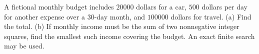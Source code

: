 A fictional monthly budget includes $20000$ dollars for a car, $500$ dollars per day for another expense over a $30$-day month, and $100000$ dollars for travel. (a) Find the total. (b) If monthly income must be the sum of two nonnegative integer squares, find the smallest such income covering the budget. An exact finite search may be used.
